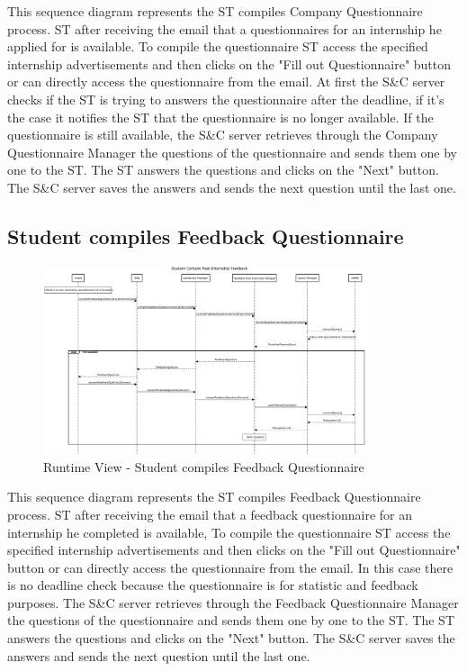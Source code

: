 \par This sequence diagram represents the ST compiles Company Questionnaire process. ST after receiving the email that
a questionnaires for an internship he applied for is available. To compile the questionnaire ST access the specified internship
advertisements and then clicks on the "Fill out Questionnaire" button or can directly access the questionnaire from the email. 
At first the S\&C server checks if the ST is trying to answers the questionnaire after the deadline, if it's the case it notifies
the ST that the questionnaire is no longer available. If the questionnaire is still available, the S\&C server retrieves through
the Company Questionnaire Manager the questions of the questionnaire and sends them one by one to the ST.
The ST answers the questions and clicks on the "Next" button. The S\&C server saves the answers and sends the next question
until the last one.  

\subsection{Student compiles Feedback Questionnaire}
\label{sub:student-compiles-feedback-questionnaire}%

\begin{figure}[H]
      \centering
      \includegraphics[width=0.85\textwidth]{Images/RV_04b.pdf}
      \caption{Runtime View - Student compiles Feedback Questionnaire}
      \label{fig:rv-student-compiles-feedback-questionnaire}
\end{figure}

\par This sequence diagram represents the ST compiles Feedback Questionnaire process. ST after receiving the email that
a feedback questionnaire for an internship he completed is available, To compile the questionnaire ST access the specified internship
advertisements and then clicks on the "Fill out Questionnaire" button or can directly access the questionnaire from the email.
In this case there is no deadline check because the questionnaire is for statistic and feedback purposes. The S\&C server retrieves
through the Feedback Questionnaire Manager the questions of the questionnaire and sends them one by one to the ST.
The ST answers the questions and clicks on the "Next" button. The S\&C server saves the answers and sends the next question
until the last one.

